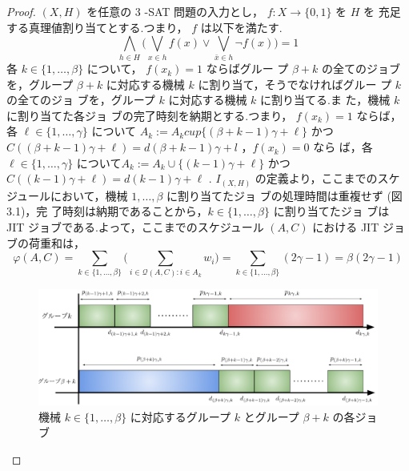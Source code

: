 \documentclass[12pt]{optlab-bachelor}
\begin{document}
\begin{proof}
  $(X,H)$ を任意の 3 -SAT 問題の入力とし， $f : X \to \{0,1\}$ を $H$ を
  充足する真理値割り当てとする.つまり， $f$ は以下を満たす.
  \begin{displaymath}
    \displaystyle \bigwedge_{h \in H} \bigg(\bigvee_{x \in h}f(x) \lor
    \bigvee_{\bar x \in h}\lnot f(x) \bigg) = 1
  \end{displaymath}
  各 $k \in \{1,\ldots, \beta\}$ について， $f(x_k) = 1$ ならばグルー
  プ $\beta + k$ の全てのジョブを，グループ $\beta + k$ に対応する機械
  $k$ に割り当て，そうでなければグルー
  プ $k$ の全てのジョ ブを，グループ $k$ に対応する機械 $k$ に割り当てる.ま
  た，機械 $k$ に割り当てた各ジョ ブの完了時刻を納期とする.つまり，
  $f(x_k) = 1$ ならば，各 $\ell \in \{1,\ldots,\gamma\}$ について $A_k
  :=A_k cup\{(\beta+k−1)\gamma+\ell\}$ かつ
  $C((\beta+k−1)\gamma+\ell)=d(\beta+k−1)\gamma+l$ ，$f(x_k)=0$ なら
  ば，各 $\ell \in \{1,\ldots,\gamma \}$ について$A_k :=A_k \cup
  \{(k−1)\gamma+\ell \}$ かつ $C((k−1)\gamma+\ell)=d(k−1)\gamma+\ell$
  . $I_{(X,H)}$ の定義より，ここまでのスケジュールにおいて，機械
  $1,\ldots, \beta$ に割り当てたジョ ブの処理時間は重複せず (図 3.1)，完
  了時刻は納期であることから，$k \in \{1,\ldots,\beta\}$ に割り当てたジョ
  ブは JIT ジョブである.よって，ここまでのスケジュール $(A, C)$ における
  JIT ジョブの荷重和は，
  \begin{displaymath}
    \displaystyle \varphi(A,C) = \sum_{k \in
    \{1,\ldots,\beta\}}\bigg(\sum_{i \in \mathcal{Q}(A,C):i \in
    A_k}w_i\bigg) = \sum_{k \in \{1,\ldots,\beta\}}(2\gamma - 1) =
    \beta(2\gamma - 1)
  \end{displaymath}

  \begin{figure}[h]
    \centering
    \includegraphics[width = 15cm]{figure/SJIT.pdf}
    \caption{機械 $k \in \{1,\ldots,\beta\}$ に対応するグループ $k$
    とグループ $\beta + k$ の各ジョブ}
  \end{figure}


\end{proof}
\end{document}
